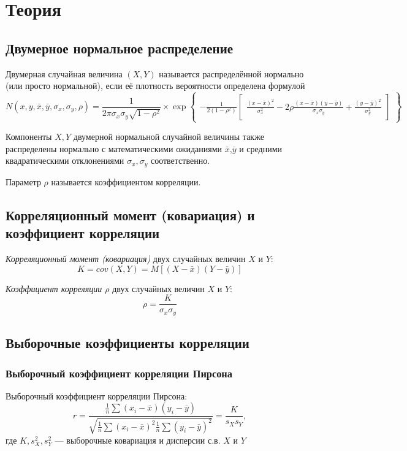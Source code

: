\documentclass[12pt,a4paper]{article}
\begin{document}
\section{Теория}
\subsection{Двумерное нормальное распределение}
Двумерная случайная величина $(X,Y)$ называется распределённой нормально (или просто нормальной), если её плотность вероятности определена формулой
\begin{equation}
    N(x,y,\bar{x},\bar{y},\sigma_x,\sigma_y,\rho)=\frac{1}{2\pi\sigma_x\sigma_y\sqrt{1-\rho^2}}\times\exp{
    \begin{Bmatrix}
        -\frac{1}{2(1-\rho^2)}
        \begin{bmatrix}
            \frac{(x-\bar{x})^2}{\sigma_x^2}-2\rho\frac{(x-\bar{x})(y-\bar{y})}{\sigma_x\sigma_y}+\frac{(y-\bar{y})^2}{\sigma_y^2}
        \end{bmatrix}
    \end{Bmatrix}
    }
\end{equation}

Компоненты $X,Y$ двумерной нормальной случайной величины также распределены нормально с математическими ожиданиями $\bar{x}$,$\bar{y}$ и средними квадратическими отклонениями $\sigma_{x},\sigma_{y}$ соответственно.

Параметр $\rho$ называется коэффициентом корреляции.

\subsection{Корреляционный момент (ковариация) и коэффициент корреляции}
\textit{Корреляционный момент (ковариация)} двух случайных величин $X$ и $Y$:
\begin{equation}
    K=cov(X,Y)=M[(X-\bar{x})(Y-\bar{y})]
\end{equation}

\textit{Коэффициент корреляции $\rho$} двух случайных величин $X$ и $Y$:
\begin{equation}
    \rho=\frac{K}{\sigma_x\sigma_y}
\end{equation}

\subsection{Выборочные коэффициенты корреляции}
\subsubsection{Выборочный коэффициент корреляции Пирсона}
Выборочный коэффициент корреляции Пирсона:
\begin{equation}
    r=\frac{\frac{1}{n}\sum{(x_i-\bar{x})(y_i-\bar{y})}}{\sqrt{\frac{1}{n}\sum{(x_i-\bar{x})^2}\frac{1}{n}\sum{(y_i-\bar{y})^2}}}=\frac{K}{s_Xs_Y},
\end{equation}
где $K,s^2_X,s^2_Y$ — выборочные ковариация и дисперсии с.в. $X$ и $Y$
\end{document}
